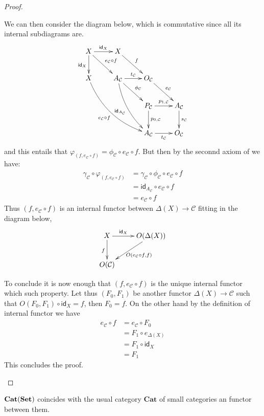 \documentclass[a4paper,UKenglish,cleveref,pdftex,thm-restate,numberwithinsect]{lipics-v2021}
\newcommand{\cat}[1]{\ensuremath{\mathbf{#1}}}
\newcommand{\cate}[1]{\mathbf{Cat}(\cat{#1})}
\newcommand{\id}[1]{\mathsf{id}_{#1}}
\def\X{\textbf {\textup{X}}}
\def\Set{\textbf {\textup{Set}}}
\begin{document}
\begin{proof}
\begin{enumerate}
	We can then consider the diagram below, which is commutative since all its internal subdiagrams are.
		\[\xymatrix{X\ar[r]^{\id{X}}  \ar[d]_{\id{X}} \ar[dr]^{e_{\mathcal{C}}\circ  f}& X \ar[dr]^{f}\\X \ar@/_.5cm/[ddrr]_{e_{\mathcal{C}}\circ f}&A_{\mathcal{C}} \ar@/_.3cm/[ddr]_{\id{A_{\mathcal{C}}}} \ar[r]^{t_{\mathcal{C}}}\ar@{>}[dr]^{\phi_{\mathcal{C}}} & O_{\mathcal{C}} \ar[dr]^{e_{\mathcal{C}}}  \\ && P_{\mathcal{C}} \ar[r]^{p_{1, \mathcal{C}}} \ar[d]^{p_{0, \mathcal{C}}}& A_{\mathcal{C}} \ar[d]^{s_{\mathcal{C}}} \\ && A_{\mathcal{C}} \ar[r]_{t_{\mathcal{C}}}& O_{\mathcal{C}} }\]
	and this entails that $\varphi_{(f, e_{\mathcal{C}}\circ f)}=\phi_{\mathcal{C}}\circ e_{\mathcal{C}}\circ f$. But then by the seconnd axiom of  we have:
	\begin{align*}
		\gamma_{\mathcal{C}}\circ \varphi_{(f, e_{\mathcal{C}}\circ f)} & = \gamma_{\mathcal{C}} \circ \phi_{\mathcal{C}}\circ e_{\mathcal{C}}\circ f\\&= \id{A_{\mathcal{C}}}\circ e_{\mathcal{C}}\circ f\\&= e_{\mathcal{C}}\circ f
	\end{align*}
	Thus $(f, e_{\mathcal{C}}\circ f)$ is an internal functor between $\Delta(X)\to \mathcal{C}$ fitting in the diagram below,
	\[\xymatrix{X \ar[r]^-{\id{X}} \ar[d]_{f}& O(\Delta(X)) \ar[dl]^{O(e_{\mathcal{C}}\circ f, f)}\\ O(\mathcal{C})}\]
	
	To conclude it is now enough that $(f, e_{\mathcal{C}}\circ f)$ is the unique internal functor which such property. Let thus $(F_0, F_1)$ be another functor $\Delta(X)\to \mathcal{C}$ such that $O(F_0, F_1)\circ \id{X}=f$, then $F_0=f$.  On the other hand by the definition of internal functor we have
	\begin{align*}
	e_{\mathcal{C}}\circ f &=  e_{\mathcal{C}}\circ F_0\\&=	F_1\circ e_{\Delta(X)}\\&= F_1\circ \id{X} \\&= F_1 
	\end{align*}
	This concludes the proof. \qedhere 
	\end{enumerate}	
	\end{proof} 

\begin{remark}\label{rem:set1}
	$\cate{\Set}$ coincides with the usual category $\cat{Cat}$ of small categories an functor between them. 
\end{remark}
\end{document}
